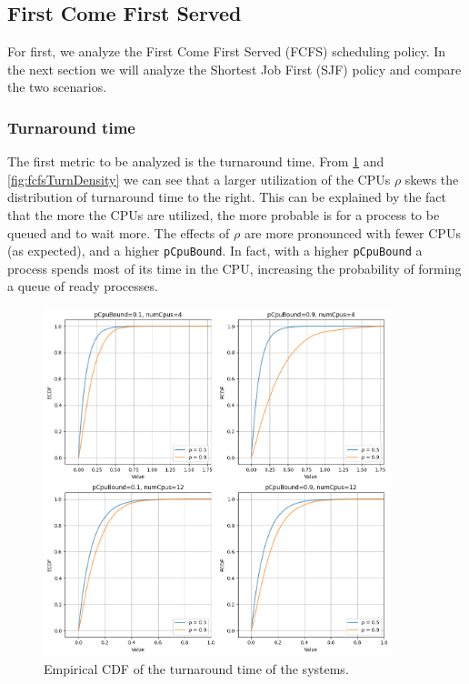 
\subsection{First Come First Served}
For first, we analyze the First Come First Served (FCFS) scheduling policy. 
In the next section we will analyze the Shortest Job First (SJF) policy and compare
the two scenarios.
\subsubsection{Turnaround time}

The first metric to be analyzed is the turnaround time.
From \cref{fig:fcfsTurnEcdf} and \cref{fig:fcfsTurnDensity} we can see that a larger utilization of the CPUs $\rho$ 
skews the distribution of turnaround time to the right. This can be explained 
by the fact that the more the CPUs are utilized, the more probable is for a
process to be queued and to wait more.
The effects of $\rho$ are more pronounced with fewer CPUs (as expected), and a higher 
\texttt{pCpuBound}. In fact, with a higher \texttt{pCpuBound} a process spends 
most of its time in the CPU, increasing the probability of forming a queue of 
ready processes.

\begin{figure}[H]
    \captionsetup{type=figure}
    \centering
    \includegraphics[width=0.9\textwidth]{./images/04/fcfs/turn/ecdf.png}
    \caption{Empirical CDF of the turnaround time of the systems.}
    \label{fig:fcfsTurnEcdf}
\end{figure}

